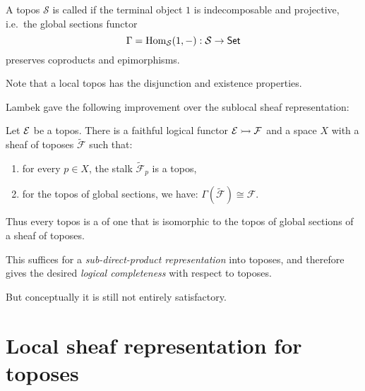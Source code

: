 \documentclass[lambek.tex]{subfiles}
\begin{document}
\begin{definition}\label{def:localtopos}
A topos $\mathcal{S}$ is called  if the terminal object $1$ is indecomposable and projective, i.e.\ the global sections functor 
\[
\Gamma = \mathrm{Hom}_\mathcal{S}(1, - ) : \mathcal{S} \to \mathsf{Set}
\]
preserves coproducts and epimorphisms.
\end{definition}
\medskip

Note that a local topos has  the disjunction and existence properties.


Lambek gave the following improvement over the sublocal sheaf representation:

\begin{theorem}[Lambek 1989]
Let $\mathcal{E}$ be a topos.  
There is a faithful logical functor $\mathcal{E}\rightarrowtail\mathcal{F}$ 
and a space $X$ with a sheaf of toposes 
$\tilde{\mathcal{F}}$ such that:
\begin{enumerate}
\item for every $p\in X$, the stalk $\tilde{\mathcal{F}}_p$ is a  topos, 
\item for the topos of global sections, we have: $\Gamma(\tilde{\mathcal{F}}) \cong \mathcal{F}$.
\end{enumerate}
Thus every topos is a  of one that is isomorphic to the topos of global sections of a sheaf of  toposes.  
\end{theorem}
\medskip

This suffices for a \emph{sub-direct-product representation} into  toposes, and therefore gives the desired \emph{logical completeness} with respect to  toposes.  

But conceptually it is still not entirely satisfactory.

\section{Local sheaf representation for toposes}\label{section:localtopos}
\end{document}
